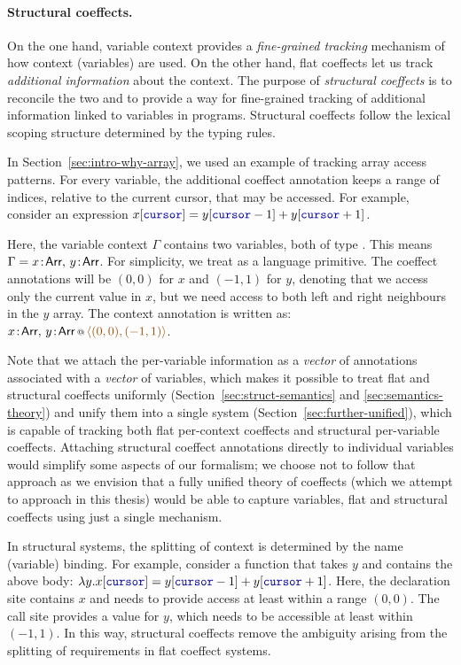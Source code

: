 \paragraph{Structural coeffects.}
On the one hand, variable context provides a \emph{fine-grained tracking} mechanism of how context
(variables) are used. On the other hand, flat coeffects let us track \emph{additional information} about
the context. The purpose of \emph{structural coeffects} is to reconcile the two and to provide a way
for fine-grained tracking of additional information linked to variables in programs. Structural
coeffects follow the lexical scoping structure determined by the typing rules.

In Section~\ref{sec:intro-why-array}, we used an example of tracking array access patterns. For every
variable, the additional coeffect annotation keeps a range of indices, relative to the current cursor,
that may be accessed. For example, consider an expression
$x[\kvd{cursor}] = y[\kvd{cursor}-1] + y[\kvd{cursor}+1]$.

Here, the variable context $\Gamma$ contains two variables, both of type . This means
$\Gamma = x\!:\!\ident{Arr},\, y\!:\!\ident{Arr}$. For simplicity, we treat  as a
language primitive. The coeffect annotations will be $(0,0)$ for $x$ and $(-1,1)$ for $y$,
denoting that we access only the current value in $x$, but we need access to both left and right
neighbours in the $y$ array. The context annotation is written as:
$\coctx{x\!:\!\ident{Arr},\, y\!:\!\ident{Arr}}{ \aclrd{\alift{ (0,0), (-1,1) }} }$.

Note that we attach the per-variable information as a \emph{vector} of annotations 
associated with a \emph{vector} of variables, which makes it possible to treat flat and structural
coeffects uniformly (Section~\ref{sec:struct-semantics} and \ref{sec:semantics-theory}) and unify
them into a single system (Section~\ref{sec:further-unified}), which is capable of tracking both
flat per-context coeffects and structural per-variable coeffects. Attaching structural coeffect
annotations directly to individual variables would simplify some aspects of our formalism; we choose
not to follow that approach as we envision that a fully unified theory of coeffects (which we 
attempt to approach in this thesis) would be able to capture variables, flat and structural coeffects 
using just a single mechanism.

In structural systems, the splitting of context is determined by the name (variable) binding.
For example, consider a function that takes $y$ and contains the above body:
$\lambda y.x[\kvd{cursor}] = y[\kvd{cursor}-1] + y[\kvd{cursor}+1]$. Here, the declaration site
contains $x$ and needs to provide access at least within a range $(0,0)$. The call site provides
a value for $y$, which needs to be accessible at least within $(-1, 1)$. In this way, structural
coeffects remove the ambiguity arising from the splitting of requirements in flat coeffect systems.

